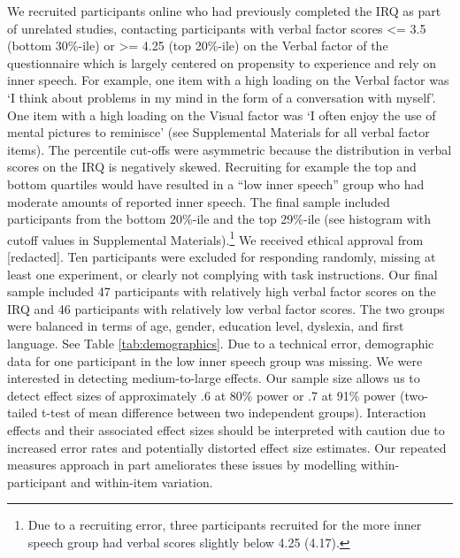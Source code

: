 \documentclass[
  man,a4paper,floatsintext]{apa6}
\begin{document}
We recruited participants online who had previously completed the IRQ as part of unrelated studies, contacting participants with verbal factor scores \textless= 3.5 (bottom 30\%-ile) or \textgreater= 4.25 (top 20\%-ile) on the Verbal factor of the questionnaire which is largely centered on propensity to experience and rely on inner speech. For example, one item with a high loading on the Verbal factor was `I think about problems in my mind in the form of a conversation with myself'. One item with a high loading on the Visual factor was `I often enjoy the use of mental pictures to reminisce' (see Supplemental Materials for all verbal factor items). The percentile cut-offs were asymmetric because the distribution in verbal scores on the IRQ is negatively skewed. Recruiting for example the top and bottom quartiles would have resulted in a ``low inner speech'' group who had moderate amounts of reported inner speech. The final sample included participants from the bottom 20\%-ile and the top 29\%-ile (see histogram with cutoff values in Supplemental Materials).\footnote{Due to a recruiting error, three participants recruited for the more inner speech group had verbal scores slightly below 4.25 (4.17).} We received ethical approval from {[}redacted{]}. Ten participants were excluded for responding randomly, missing at least one experiment, or clearly not complying with task instructions. Our final sample included 47 participants with relatively high verbal factor scores on the IRQ and 46 participants with relatively low verbal factor scores. The two groups were balanced in terms of age, gender, education level, dyslexia, and first language. See Table \ref{tab:demographics}. Due to a technical error, demographic data for one participant in the low inner speech group was missing. We were interested in detecting medium-to-large effects. Our sample size allows us to detect effect sizes of approximately .6 at 80\% power or .7 at 91\% power (two-tailed t-test of mean difference between two independent groups). Interaction effects and their associated effect sizes should be interpreted with caution due to increased error rates and potentially distorted effect size estimates. Our repeated measures approach in part ameliorates these issues by modelling within-participant and within-item variation.
\end{document}
